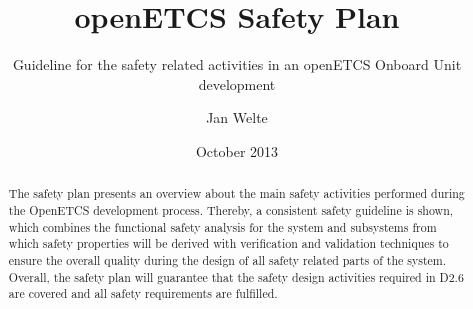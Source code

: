 \documentclass{template/openetcs_report}
\begin{document}
\frontmatter
{}




\title{openETCS Safety Plan}

\subtitle{Guideline for the safety related activities in an openETCS Onboard Unit development}

\date{October 2013} %


\author{Jan Welte}









\begin{abstract}
The safety plan presents an overview about the main safety activities performed during the OpenETCS development process. Thereby, a consistent safety guideline is shown, which combines the functional safety analysis for the system and subsystems from which safety properties will be derived with verification and validation techniques to ensure the overall quality during the design of all safety related parts of the system. Overall, the safety plan will guarantee that the safety design activities required in D2.6 are covered and all safety requirements are fulfilled. 
\end{abstract}

\maketitle
\tableofcontents
\listoffiguresandtables
\newpage
\end{document}
